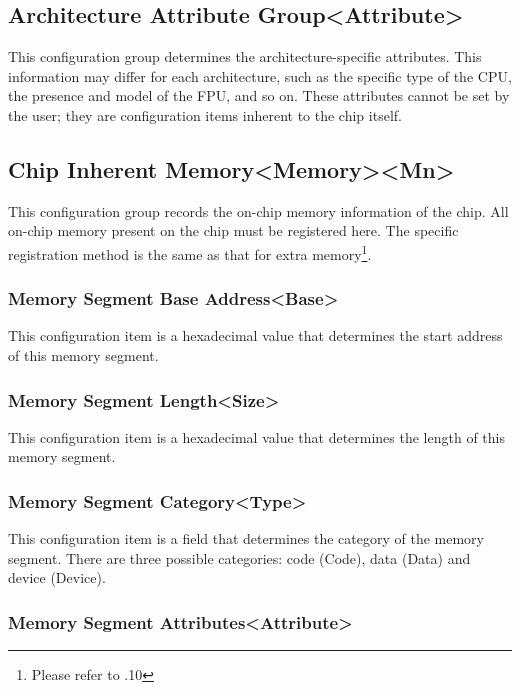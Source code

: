 \subsection{Architecture Attribute Group<Attribute>{}}\label{subsec:5-5-11}

This configuration group determines the architecture-specific attributes. This information may differ for each architecture, such as the specific type of the CPU, the presence and model of the FPU, and so on. These attributes cannot be set by the user; they are configuration items inherent to the chip itself.

\subsection{Chip Inherent Memory<Memory><Mn>{}}\label{subsec:5-5-12}

This configuration group records the on-chip memory information of the chip. All on-chip memory present on the chip must be registered here. The specific registration method is the same as that for extra memory\footnote{Please refer to .10}.

\subsubsection{Memory Segment Base Address<Base>{}}\label{subsubsec:5-5-12-1}

This configuration item is a hexadecimal value that determines the start address of this memory segment.

\subsubsection{Memory Segment Length<Size>{}}\label{subsubsec:5-5-12-2}

This configuration item is a hexadecimal value that determines the length of this memory segment.

\subsubsection{Memory Segment Category<Type>{}}\label{subsubsec:5-5-12-3}

This configuration item is a field that determines the category of the memory segment. There are three possible categories: code (Code), data (Data) and device (Device).

\subsubsection{Memory Segment Attributes<Attribute>{}}\label{subsubsec:5-5-12-4}

